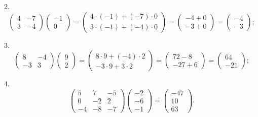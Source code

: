 \documentclass[14pt,a4paper]{extarticle}
\begin{document}
2. \[\begin{pmatrix} 4 & -7 \\ 3 & -4 \end{pmatrix}\begin{pmatrix} -1 \\ 0 \end{pmatrix} 
= \begin{pmatrix} 4 \cdot (-1) + (-7) \cdot 0 \\ 3 \cdot (-1) + (-4) \cdot 0 \end{pmatrix}
=\begin{pmatrix} -4 + 0 \\ -3 + 0 \end{pmatrix}
=\begin{pmatrix} -4 \\ -3 \end{pmatrix};\]

3. \[\begin{pmatrix} 8 & -4 \\ -3 & 3 \end{pmatrix}\begin{pmatrix} 9 \\ 2 \end{pmatrix} 
= \begin{pmatrix} 8 \cdot 9 + (-4) \cdot 2 \\ -3 \cdot 9 + 3 \cdot 2 \end{pmatrix}
=\begin{pmatrix} 72 - 8 \\ -27 + 6 \end{pmatrix}
=\begin{pmatrix} 64 \\ -21 \end{pmatrix};\]

4. \[\begin{pmatrix} 5 & 7 & -5 \\ 0 & -2 & 2 \\ -4 & -8 & -7 \end{pmatrix}\begin{pmatrix} -2 \\ -6 \\ -1\end{pmatrix}
=\begin{pmatrix} -47 \\ 10 \\ 63 \end{pmatrix}.\]
\end{document}

